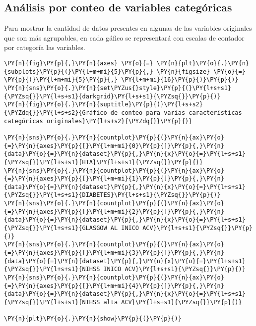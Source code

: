     \hypertarget{anuxe1lisis-por-conteo-de-variables-categuxf3ricas}{%
\subsection{Análisis por conteo de variables categóricas}\label{anuxe1lisis-por-conteo-de-variables-categuxf3ricas}}

Para mostrar la cantidad de datos presentes en algunas de las variables originales que son más agrupables, en cada gáfico se representará con escalas de contador por categoría las variables.

    \begin{tcolorbox}[breakable, size=fbox, boxrule=1pt, pad at break*=1mm,colback=cellbackground, colframe=cellborder]
\begin{Verbatim}[commandchars=\\\{\}]
\PY{n}{fig}\PY{p}{,}\PY{n}{axes} \PY{o}{=} \PY{n}{plt}\PY{o}{.}\PY{n}{subplots}\PY{p}{(}\PY{l+m+mi}{5}\PY{p}{,} \PY{n}{figsize} \PY{o}{=} \PY{p}{(}\PY{l+m+mi}{5}\PY{p}{,} \PY{l+m+mi}{16}\PY{p}{)}\PY{p}{)}
\PY{n}{sns}\PY{o}{.}\PY{n}{set\PYZus{}style}\PY{p}{(}\PY{l+s+s1}{\PYZsq{}}\PY{l+s+s1}{darkgrid}\PY{l+s+s1}{\PYZsq{}}\PY{p}{)}
\PY{n}{fig}\PY{o}{.}\PY{n}{suptitle}\PY{p}{(}\PY{l+s+s2}{\PYZdq{}}\PY{l+s+s2}{Gráfico de conteo para varias características categóricas originales}\PY{l+s+s2}{\PYZdq{}}\PY{p}{)}

\PY{n}{sns}\PY{o}{.}\PY{n}{countplot}\PY{p}{(}\PY{n}{ax}\PY{o}{=}\PY{n}{axes}\PY{p}{[}\PY{l+m+mi}{0}\PY{p}{]}\PY{p}{,}\PY{n}{data}\PY{o}{=}\PY{n}{dataset}\PY{p}{,}\PY{n}{x}\PY{o}{=}\PY{l+s+s1}{\PYZsq{}}\PY{l+s+s1}{HTA}\PY{l+s+s1}{\PYZsq{}}\PY{p}{)}
\PY{n}{sns}\PY{o}{.}\PY{n}{countplot}\PY{p}{(}\PY{n}{ax}\PY{o}{=}\PY{n}{axes}\PY{p}{[}\PY{l+m+mi}{1}\PY{p}{]}\PY{p}{,}\PY{n}{data}\PY{o}{=}\PY{n}{dataset}\PY{p}{,}\PY{n}{x}\PY{o}{=}\PY{l+s+s1}{\PYZsq{}}\PY{l+s+s1}{DIABETES}\PY{l+s+s1}{\PYZsq{}}\PY{p}{)}
\PY{n}{sns}\PY{o}{.}\PY{n}{countplot}\PY{p}{(}\PY{n}{ax}\PY{o}{=}\PY{n}{axes}\PY{p}{[}\PY{l+m+mi}{2}\PY{p}{]}\PY{p}{,}\PY{n}{data}\PY{o}{=}\PY{n}{dataset}\PY{p}{,}\PY{n}{x}\PY{o}{=}\PY{l+s+s1}{\PYZsq{}}\PY{l+s+s1}{GLASGOW AL INICO ACV}\PY{l+s+s1}{\PYZsq{}}\PY{p}{)}
\PY{n}{sns}\PY{o}{.}\PY{n}{countplot}\PY{p}{(}\PY{n}{ax}\PY{o}{=}\PY{n}{axes}\PY{p}{[}\PY{l+m+mi}{3}\PY{p}{]}\PY{p}{,}\PY{n}{data}\PY{o}{=}\PY{n}{dataset}\PY{p}{,}\PY{n}{x}\PY{o}{=}\PY{l+s+s1}{\PYZsq{}}\PY{l+s+s1}{NIHSS INICO ACV}\PY{l+s+s1}{\PYZsq{}}\PY{p}{)}
\PY{n}{sns}\PY{o}{.}\PY{n}{countplot}\PY{p}{(}\PY{n}{ax}\PY{o}{=}\PY{n}{axes}\PY{p}{[}\PY{l+m+mi}{4}\PY{p}{]}\PY{p}{,}\PY{n}{data}\PY{o}{=}\PY{n}{dataset}\PY{p}{,}\PY{n}{x}\PY{o}{=}\PY{l+s+s1}{\PYZsq{}}\PY{l+s+s1}{NIHSS alta ACV}\PY{l+s+s1}{\PYZsq{}}\PY{p}{)}

\PY{n}{plt}\PY{o}{.}\PY{n}{show}\PY{p}{(}\PY{p}{)}
\end{Verbatim}
\end{tcolorbox}

